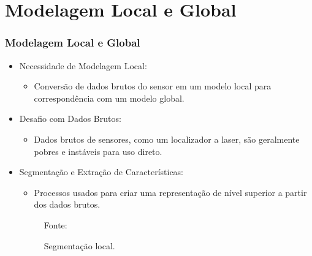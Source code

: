 \documentclass[xcolor=dvipsnames, aspectratio=169]{beamer}
\begin{document}
\section{Modelagem Local e Global}
\begin{frame}
  \frametitle{Modelagem Local e Global}
  \begin{itemize}
      \item Necessidade de Modelagem Local: 
      \begin{itemize}
        \item Conversão de dados brutos do sensor em um modelo local para correspondência com um modelo global.
      \end{itemize}
      \item Desafio com Dados Brutos:
      \begin{itemize}
        \item Dados brutos de sensores, como um localizador a laser, são geralmente pobres e instáveis para uso direto.
      \end{itemize}
      \item Segmentação e Extração de Características:
      \begin{itemize}
        \item Processos usados para criar uma representação de nível superior a partir dos dados brutos.
      \end{itemize}
      \begin{figure}
        \centering
        {Fonte: \cite{moutarlier2006experimental}}
        \caption{Segmentação local.}
        \label{fig:1_range_sensor_obstacle}
      \end{figure}
  \end{itemize}
\end{frame}
  
\end{document}
